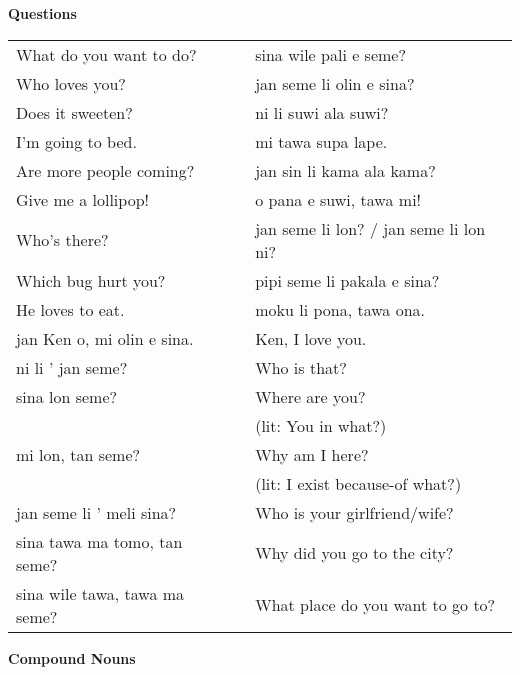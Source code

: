 \textbf{Questions} 
\label{'questions_using_seme'}

\begin{supertabular}{p{5,5cm}|ll}
What do you want to do?  && sina wile pali e seme? \\ %
Who loves you?  && jan seme li olin e sina? \\ %
Does it sweeten? && ni li suwi ala suwi? \\ %
I'm going to bed.  && mi tawa supa lape. \\ %
Are more people coming?  && jan sin li kama ala kama? \\ %
Give me a lollipop!  && o pana e suwi, tawa mi! \\ %
Who's there?  && jan seme li lon? / jan seme li lon ni? \\ %
Which bug hurt you?  && pipi seme li pakala e sina? \\ %
He loves to eat.  && moku li pona, tawa ona. \\ %
jan Ken o, mi olin e sina.  && Ken, I love you. \\
ni li ' jan seme?  && Who is that? \\
sina lon seme?  && Where are you? \\ 
                &&   (lit: You in what?) \\ %
mi lon, tan seme?  && Why am I here? \\ 
                &&   (lit: I exist because-of what?) \\ %
jan seme li ' meli sina?  && Who is your girlfriend/wife? \\
sina tawa ma tomo, tan seme?  && Why did you go to the city? \\
sina wile tawa, tawa ma seme?  && What place do you want to go to? \\
\end{supertabular} 

\textbf{Compound Nouns} 
\label{'pi'}


